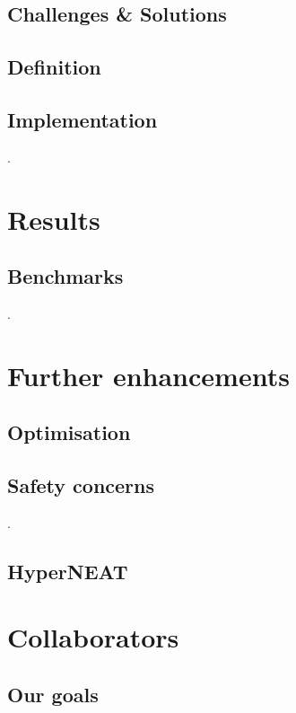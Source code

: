 \documentclass[11pt]{article}
\begin{document}
		\subsection{Challenges \& Solutions}
			
		\subsection{Definition}
			
		\subsection{Implementation}
			.
	\newpage

	\section{Results}
		\subsection{Benchmarks}
			.
	\newpage

	\section{Further enhancements}
		\subsection{Optimisation}
			
		\subsection{Safety concerns}
			.
		\subsection{HyperNEAT}
			
	\newpage

	\section{Collaborators}
		
		\subsection{Our goals}
		
	\newpage
\end{document}
